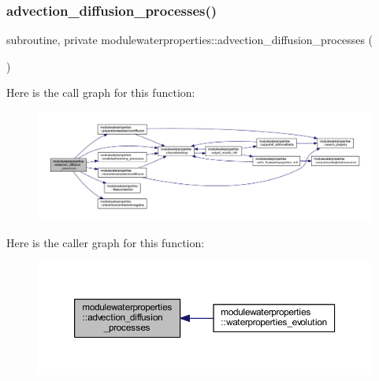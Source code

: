 \subsubsection{\texorpdfstring{advection\+\_\+diffusion\+\_\+processes()}{advection\_diffusion\_processes()}}
{\footnotesize\ttfamily subroutine, private modulewaterproperties\+::advection\+\_\+diffusion\+\_\+processes (\begin{DoxyParamCaption}{ }\end{DoxyParamCaption})\hspace{0.3cm}{\ttfamily [private]}}

Here is the call graph for this function\+:\nopagebreak
\begin{figure}[H]
\begin{center}
\leavevmode
\includegraphics[width=350pt]{namespacemodulewaterproperties_a2450d655461a0013ffb3d932848b59b7_cgraph}
\end{center}
\end{figure}
Here is the caller graph for this function\+:\nopagebreak
\begin{figure}[H]
\begin{center}
\leavevmode
\includegraphics[width=350pt]{namespacemodulewaterproperties_a2450d655461a0013ffb3d932848b59b7_icgraph}
\end{center}
\end{figure}
\mbox{\label{namespacemodulewaterproperties_a7cc00cb7efcee6190d254a8eb846064c}} 
